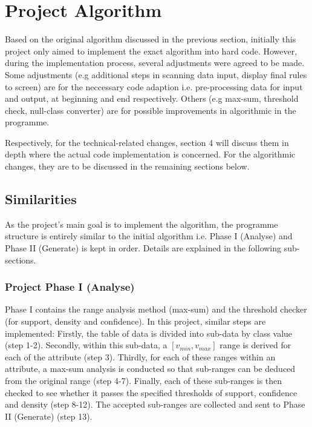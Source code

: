 \chapter{Project Algorithm}

Based on the original algorithm discussed in the previous section, initially this project only aimed to implement the exact algorithm into hard code. However, during the implementation process, several adjustments were agreed to be made. Some adjustments (e.g additional steps in scanning data input, display final rules to screen) are for the neccessary code adaption i.e. pre-processing data for input and output, at beginning and end respectively. Others (e.g max-sum, threshold check, null-class converter) are for possible improvements in algorithmic in the programme. 

Respectively, for the technical-related changes, section 4 will discuss them in depth where the actual code implementation is concerned. For the algorithmic changes, they are to be discussed in the remaining sections below.

\section{Similarities}

As the project’s main goal is to implement the algorithm, the programme structure is entirely similar to the initial algorithm i.e. Phase I (Analyse) and Phase II (Generate) is kept in order. Details are explained in the following sub-sections. \\


\subsection{Project Phase I (Analyse)}

Phase I contains the range analysis method (max-sum) and the threshold checker (for support, density and confidence). In this project, similar steps are implemented: Firstly, the table of data is divided into sub-data by class value (step 1-2). Secondly, within this sub-data, a $[v_{min}, v_{max}]$ range is derived for each of the attribute (step 3). Thirdly, for each of these ranges within an attribute, a max-sum analysis is conducted so that sub-ranges can be deduced from the original range (step 4-7). Finally, each of these sub-ranges is then checked to see whether it passes the specified thresholds of support, confidence and density (step 8-12). The accepted sub-ranges are collected and sent to Phase II (Generate) (step 13).

